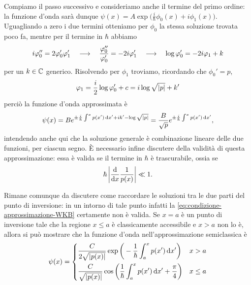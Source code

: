 Compiamo il passo successivo e consideriamo anche il termine del primo ordine: la funzione d'onda sarà dunque $\psi(x)=A\exp\big(\frac{i}{\hbar}\phi_0(x)+i\phi_1(x)\big)$.
Uguagliando a zero i due termini otteniamo per $\phi_0$ la stessa soluzione trovata poco fa, mentre per il termine in $\hbar$ abbiamo
\begin{equation}
	i\varphi_0''=2\varphi_0'\varphi_1'\quad\longrightarrow\quad \frac{\varphi_0''}{\varphi_0'}=-2i\varphi_1'\quad\longrightarrow\quad \log\varphi_0'=-2i\varphi_1+k
\end{equation}
per un $k\in\mathbb{C}$ generico.
Risolvendo per $\phi_1$ troviamo, ricordando che $\phi_0'=p$,
\begin{equation}
	\varphi_1=\frac{i}2\log\varphi_0'+c=i\log\sqrt{\left|{p}\right|}+k'
\end{equation}
perciò la funzione d'onda approssimata è
\begin{equation}
	\psi(x)=Be^{\pm\frac{i}{\hbar}\int^xp(x')\,\textup{d} x'+ik'-\log\sqrt{\left|{p}\right|}}=\frac{B}{\sqrt{p}}e^{\pm\frac{i}{\hbar}\int^xp(x')\,\textup{d} x'},
	\label{eq:soluzione-WKB-ordine-1}
\end{equation}
intendendo anche qui che la soluzione generale è combinazione lineare delle due funzioni, per ciascun segno.
È necessario infine discutere della validità di questa approssimazione: essa è valida se il termine in $\hbar$ è trascurabile, ossia se
\begin{equation}
	\hbar\left|{\frac{\textup{d} {}}{\textup{d} {x}}\frac1{p(x)}}\right|\ll 1.
	\label{eq:condizione-approssimazione-WKB}
\end{equation}

Rimane comunque da discutere come raccordare le soluzioni tra le due parti del punto di inversione: in un intorno di tale punto infatti la \eqref{eq:condizione-approssimazione-WKB} certamente non è valida.
Se $x=a$ è un punto di inversione tale che la regione $x\le a$ è classicamente accessibile e $x>a$ non lo è, allora si può mostrare che la funzione d'onda nell'approssimazione semiclassica è
\begin{equation}
	\psi(x)=
	\begin{dcases}
		\frac{C}{2\sqrt{\left|{p(x)}\right|}}\exp\bigg(-\frac1{\hbar}\int_a^xp(x')\,\textup{d} x'\bigg)				&x>a\\
		\frac{C}{\sqrt{\left|{p(x)}\right|}}\cos\bigg(\frac1{\hbar}\int_a^xp(x')\,\textup{d} x'+\frac{\pi}4\bigg)	&x\le a
	\end{dcases}
	\label{eq:wf-semiclassica}
\end{equation}

